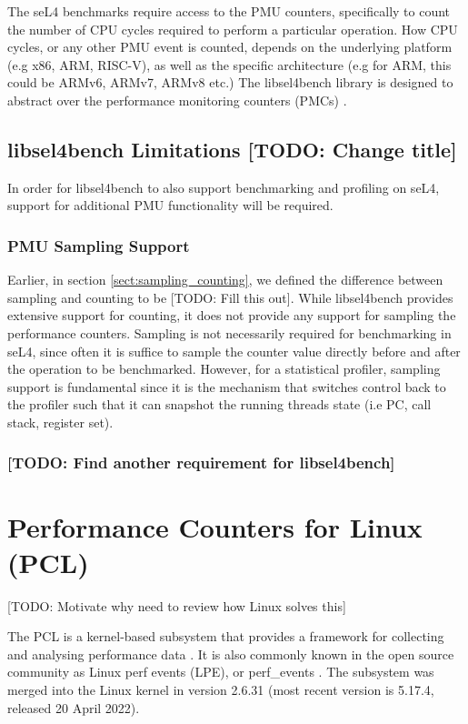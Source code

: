 The seL4 benchmarks require access to the PMU counters, specifically to count the number of CPU cycles required to perform a particular operation. How CPU cycles, or any other PMU event is counted, depends on the underlying platform (e.g x86, ARM, RISC-V), as well as the specific architecture (e.g for ARM, this could be ARMv6, ARMv7, ARMv8 etc.) The libsel4bench library is designed to abstract over the performance monitoring counters (PMCs) \cite{github_libsel4bench_sel4bench_header}.

\subsection{libsel4bench Limitations [TODO: Change title]}

In order for libsel4bench to also support benchmarking and profiling on seL4, support for additional PMU functionality will be required. 

\subsubsection{PMU Sampling Support}
Earlier, in section \ref{sect:sampling_counting}, we defined the difference between sampling and counting to be [TODO: Fill this out]. While libsel4bench provides extensive support for counting, it does not provide any support for sampling the performance counters. Sampling is not necessarily required for benchmarking in seL4, since often it is suffice to sample the counter value directly before and after the operation to be benchmarked. However, for a statistical profiler, sampling support is fundamental since it is the mechanism that switches control back to the profiler such that it can snapshot the running threads state (i.e PC, call stack, register set).

\subsubsection{[TODO: Find another requirement for libsel4bench]}

\section{Performance Counters for Linux (PCL)}

[TODO: Motivate why need to review how Linux solves this]

The PCL is a kernel-based subsystem that provides a framework for collecting and analysing performance data \cite{DocsRedHatPCL}. It is also commonly known in the open source community as Linux perf events (LPE), or perf\_events \cite{BlogBrendandGreggPerf}. The subsystem was merged into the Linux kernel in version 2.6.31 \cite{DocsUnofficialLinxPerfEvents} (most recent version is 5.17.4, released 20 April 2022). 

